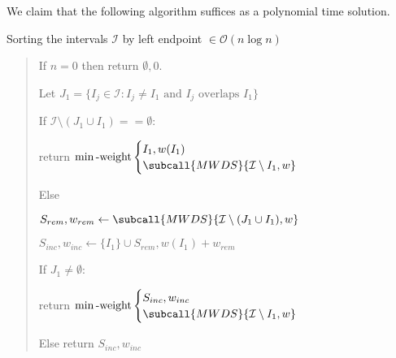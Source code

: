 \documentclass{article}
\begin{document}
\begin{solution}
We claim that the following algorithm suffices as a polynomial time solution.
\begin{subproof}[Preprocessing]
    Sorting the intervals $\mathcal{I}$ by left endpoint $\in \mathcal{O}(n\log n)$
\end{subproof}

\begin{subproof}[Algorithm]

\begin{quote}%

\begin{steps}
    \item If $n = 0$ then return $\emptyset, 0$.
    \item Let $J_1 = \{I_j \in \mathcal{I} : I_j\neq I_1 \text{ and } I_j \text{ overlaps } I_1\}$
    \item If $\mathcal{I} \setminus (J_1 \cup {I_1}) == \emptyset$:
    \begin{steps}
        \item return $ \min\text{-weight} \begin{cases}
            I_1, w(I_1)\\
            \subcall{MWDS}{\mathcal{I} \setminus {I_1},w}
        \end{cases}$
    \end{steps}
    \item Else
    \begin{steps}
    \item $S_{rem}, w_{rem}\leftarrow \subcall{MWDS}{\mathcal{I} \setminus (J_1 \cup {I_1}), w}$
        \item $S_{inc}, w_{inc}\leftarrow \{I_1\} \cup S_{rem} , w(I_1) + w_{rem}$
        \item If $J_1 \neq \emptyset$:
        \begin{steps}
            \item return $ \min\text{-weight} \begin{cases}
           S_{inc},w_{inc}\\
            \subcall{MWDS}{\mathcal{I} \setminus {I_1},w}
        \end{cases}$
        \end{steps}
        \item Else return $S_{inc},w_{inc}$


\end{steps}
\end{steps}
\end{quote}
\end{subproof}
\end{solution}
\end{document}
